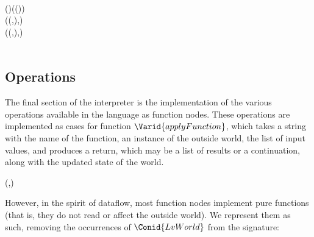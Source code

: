 \begin{hscode}
\\
\>[4]{}\<[7]%
\>[7]{}\<[14]%
\>[14]{}\mathrel{=}{}\<[17]%
\>[17]{}\;\;\mathbin{\$}\;(\;)\;(\;(\;)){}\<[E]%
\\[\blanklineskip]%
\>[4]{}\<[7]%
\>[7]{}\mathbin{::}{}\<[25]%
\>[25]{}\;\to ((,),)\to {}\;\<[E]%
\\
\>[4]{}\<[7]%
\>[7]{}\;\;((\anonymous ,\;),)\mathrel{=}{}\<[E]%
\\
\>[7]{}\<[10]%
\>[10]{}\;\;\;\<[E]%
\\
\>[4]{}\<[7]%
\>[7]{}\;\;\anonymous \mathrel{=}\<[E]%
\ColumnHook
\end{hscode}\resethooks

\subsection{Operations}

The final section of the interpreter is the implementation of the various
operations available in the language as function nodes. These operations
are implemented as cases for function \ensuremath{\Varid{applyFunction}}, which takes a
string with the name of the function, an instance of the outside world,
the list of input values, and produces a return, which may be a list of
results or a continuation, along with the updated state of the world.

\begin{hscode}\SaveRestoreHook
{}%
%
\>[B]{}\mathbin{::}\to {}\to (,){}\<[E]%
\ColumnHook
\end{hscode}\resethooks

However, in the spirit of dataflow, most function nodes implement pure
functions (that is, they do not read or affect the outside world). We
represent them as such, removing the occurrences of \ensuremath{\Conid{LvWorld}} from the
signature:

